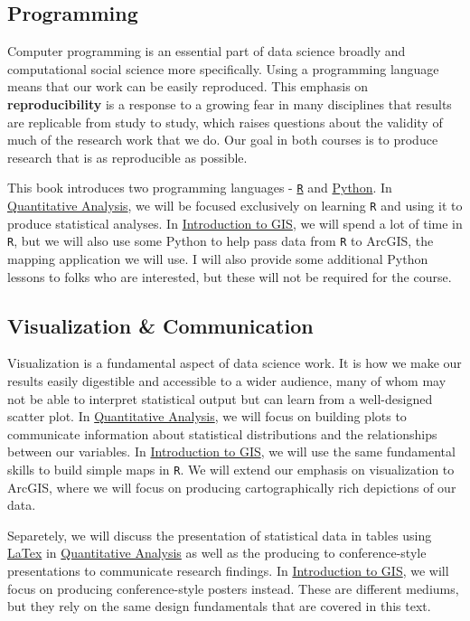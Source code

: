 \documentclass[]{book}
\theoremstyle{definition}
\theoremstyle{definition}
\theoremstyle{definition}
\theoremstyle{remark}
\begin{document}
\subsection{Programming}\label{programming}

Computer programming is an essential part of data science broadly and
computational social science more specifically. Using a programming
language means that our work can be easily reproduced. This emphasis on
\textbf{reproducibility} is a response to a growing fear in many
disciplines that results are replicable from study to study, which
raises questions about the validity of much of the research work that we
do. Our goal in both courses is to produce research that is as
reproducible as possible.

This book introduces two programming languages -
\href{https://en.wikipedia.org/wiki/R_(programming_language)}{\texttt{R}}
and
\href{https://en.wikipedia.org/wiki/Python_(programming_language)}{Python}.
In \href{https://slu-soc5050.github.io}{Quantitative Analysis}, we will
be focused exclusively on learning \texttt{R} and using it to produce
statistical analyses. In
\href{https://slu-soc5650.github.io}{Introduction to GIS}, we will spend
a lot of time in \texttt{R}, but we will also use some Python to help
pass data from \texttt{R} to ArcGIS, the mapping application we will
use. I will also provide some additional Python lessons to folks who are
interested, but these will not be required for the course.

\subsection{Visualization \&
Communication}\label{visualization-communication}

Visualization is a fundamental aspect of data science work. It is how we
make our results easily digestible and accessible to a wider audience,
many of whom may not be able to interpret statistical output but can
learn from a well-designed scatter plot. In
\href{https://slu-soc5050.github.io}{Quantitative Analysis}, we will
focus on building plots to communicate information about statistical
distributions and the relationships between our variables. In
\href{https://slu-soc5650.github.io}{Introduction to GIS}, we will use
the same fundamental skills to build simple maps in \texttt{R}. We will
extend our emphasis on visualization to ArcGIS, where we will focus on
producing cartographically rich depictions of our data.

Separetely, we will discuss the presentation of statistical data in
tables using \href{https://en.wikipedia.org/wiki/LaTeX}{LaTex} in
\href{https://slu-soc5050.github.io}{Quantitative Analysis} as well as
the producing to conference-style presentations to communicate research
findings. In \href{https://slu-soc5650.github.io}{Introduction to GIS},
we will focus on producing conference-style posters instead. These are
different mediums, but they rely on the same design fundamentals that
are covered in this text.
\end{document}
